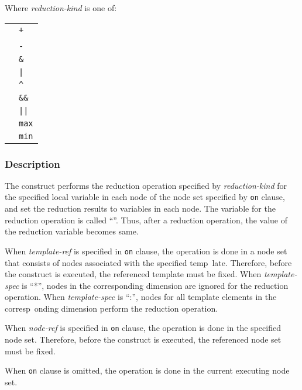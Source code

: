 Where {\it reduction-kind} is one of:

\begin{tabular}{ll}
 \hspace{0.5cm} & {\tt +} \\
 & {\tt *} \\
 & {\tt -} \\
 & {\verb|&|} \\
 & {\tt |} \\
 & {\verb|^|} \\
 & {\verb|&&|} \\
 & {\tt ||} \\
 & {\tt max} \\
 & {\tt min} \\
\end{tabular}

\subsubsection*{Description}

The {\tt {}} construct performs the
reduction operation specified by {\it reduction-kind} for the specified
local variable in each node of the node set specified by {\tt on}
clause, and set the reduction results to variables in each node. The
variable for the reduction operation is called ``''. Thus, after a reduction operation, the value of the
reduction variable becomes same.

When {\it template-ref} is specified in {\tt on} clause, the operation
is done in a node set that consists of nodes associated with the specified temp\
late.
Therefore, before the {\tt {}} construct is executed, the
referenced template must be fixed. When {\it template-spec} is ``*'',
nodes in the corresponding dimension are ignored for the reduction operation.
When {\it template-spec} is ``:'', nodes for all template elements in the corresp\
onding
dimension perform the reduction operation.

When {\it node-ref} is specified in {\tt on} clause, the operation
is done in the specified node set. Therefore, before the {\tt {}} construct is executed, the
referenced node set must be fixed.

When {\tt on} clause is omitted, the operation is done in the current
executing node set.

